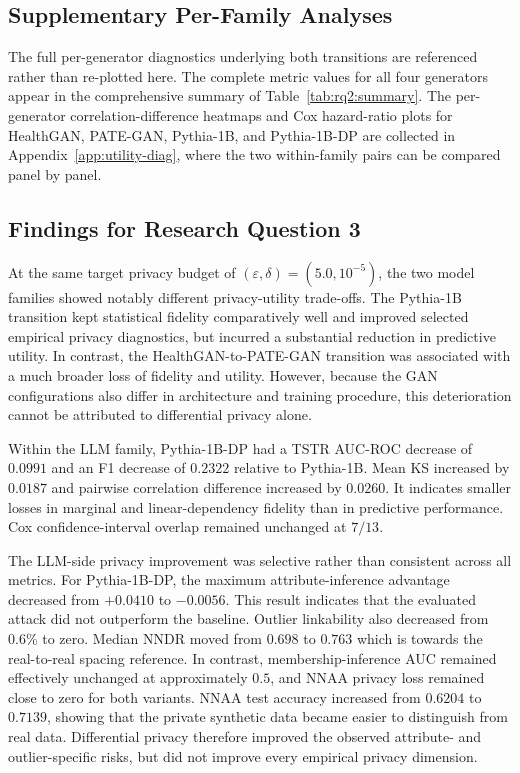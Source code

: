 \subsection{Supplementary Per-Family Analyses}
\label{sec:results:rq3:supplementary}

The full per-generator diagnostics underlying both transitions are
referenced rather than re-plotted here. The complete metric values for all
four generators appear in the comprehensive summary of
Table~\ref{tab:rq2:summary}. The per-generator correlation-difference
heatmaps and Cox hazard-ratio plots for HealthGAN, PATE-GAN, Pythia-1B, and
Pythia-1B-DP are collected in Appendix~\ref{app:utility-diag}, where the
two within-family pairs can be compared panel by panel.

\subsection*{Findings for Research Question 3}
\label{sec:results:rq3:answer}

At the same target privacy budget of
$(\varepsilon,\delta)=(5.0,10^{-5})$, the two model families showed
notably different privacy-utility trade-offs. 
The Pythia-1B transition kept statistical fidelity
comparatively well and improved selected empirical privacy diagnostics,
but incurred a substantial reduction in predictive utility. In contrast,
the HealthGAN-to-PATE-GAN transition was associated with a much broader
loss of fidelity and utility. However, because the GAN configurations
also differ in architecture and training procedure, this deterioration
cannot be attributed to differential privacy alone.

Within the LLM family, Pythia-1B-DP had a TSTR AUC-ROC decrease of
$0.0991$ and an F1 decrease of $0.2322$ relative to Pythia-1B. Mean KS
increased by $0.0187$ and pairwise correlation difference increased by
$0.0260$. It indicates smaller losses in marginal and linear-dependency
fidelity than in predictive performance. Cox confidence-interval overlap
remained unchanged at $7/13$.

The LLM-side privacy improvement was selective rather than consistent
across all metrics. For Pythia-1B-DP, the maximum attribute-inference advantage decreased
from $+0.0410$ to $-0.0056$. This result indicates that the evaluated
attack did not outperform the baseline. Outlier linkability also
decreased from $0.6\%$ to zero. Median NNDR moved from $0.698$ to
$0.763$ which is towards the real-to-real spacing reference. In contrast,
membership-inference AUC remained effectively unchanged at approximately
$0.5$, and NNAA privacy loss remained close to zero for both variants.
NNAA test accuracy increased from $0.6204$ to $0.7139$, showing that the
private synthetic data became easier to distinguish from real data.
Differential privacy therefore improved the observed attribute- and
outlier-specific risks, but did not improve every empirical privacy
dimension.

